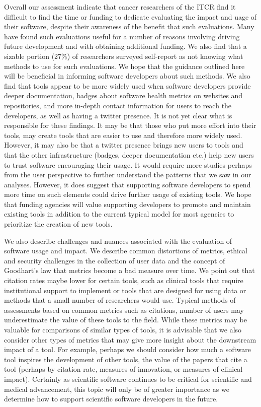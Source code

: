 \documentclass{article}
\begin{document}
Overall our assessment indicate that cancer researchers of the ITCR find it difficult to find the time or funding to dedicate evaluating the impact and uage of their software, despite their awareness of the benefit that such evaluations. Many have found such evaluations useful for a number of reasons involving driving future development and with obtaining additional funding. We also find that a sizable portion (27\%) of researchers surveyed self-report as not knowing what methods to use for such evaluations. We hope that the guidance outlined here will be beneficial in informing software developers about such methods.  We also find that tools appear to be more widely used when software developers provide deeper documentation, badges about software health metrics on websites and repositories, and more in-depth contact information for users to reach the developers, as well as having a twitter presence. It is not yet clear what is responsible for these findings. It may be that those who put more effort into their tools, may create tools that are easier to use and therefore more widely used. However, it may also be that a twitter presence brings new users to tools and that the other infrastructure (badges, deeper documentation etc.) help new users to trust software encouraging their usage. It would require more studies perhaps from the user perspective to further understand the patterns that we saw in our analyses. However, it does suggest that supporting software developers to spend more time on such elements could drive further usage of existing tools. We hope that funding agencies will value supporting developers to promote and maintain existing tools in addition to the current typical model for most agencies to prioritize the creation of new tools.

We also describe challenges and nuances associated with the evaluation of software usage and impact. We describe common distortions of metrics, ethical and security challenges in the collection of user data and the concept of Goodhart's law that metrics become a bad measure over time. We point out that citation rates maybe lower for certain tools, such as clinical tools that require institutional support to implement or tools that are designed for using data or methods that a small number of researchers would use. Typical methods of assessments based on common metrics such as citations, number of users may underestimate the value of these tools to the field. While these metrics may be valuable for comparisons of similar types of tools, it is advisable that we also consider other types of metrics that may give more insight about the downstream impact of a tool. For example, perhaps we should consider how much a software tool inspires the development of other tools, the value of the papers that cite a tool (perhaps by citation rate, measures of innovation, or measures of clinical impact). Certainly as scientific software continues to be critical for scientific and medical advancement, this topic will only be of greater importance as we determine how to support scientific software developers in the future. 
 
 














 
 


\end{document}
